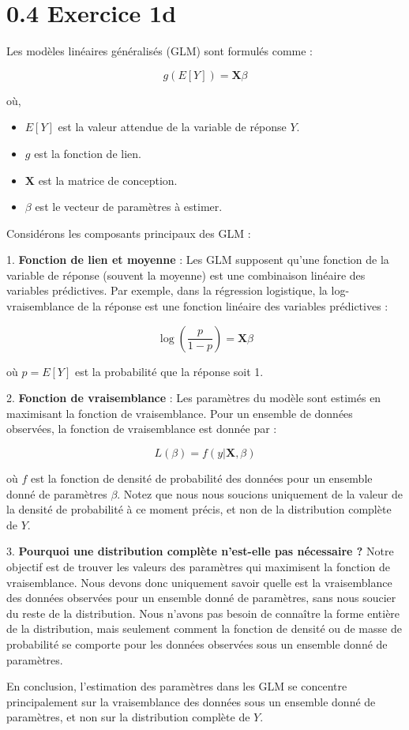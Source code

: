 \documentclass{article}
\begin{document}
\section*{0.4 Exercice 1d}

Les modèles linéaires généralisés (GLM) sont formulés comme :

\[ g(E[Y]) = \mathbf{X}\beta \]

où,
\begin{itemize}
    \item \( E[Y] \) est la valeur attendue de la variable de réponse \( Y \).
    \item \( g \) est la fonction de lien.
    \item \( \mathbf{X} \) est la matrice de conception.
    \item \( \beta \) est le vecteur de paramètres à estimer.
\end{itemize}

Considérons les composants principaux des GLM :

1. \textbf{Fonction de lien et moyenne} :
Les GLM supposent qu'une fonction de la variable de réponse (souvent la moyenne) est une combinaison linéaire des variables prédictives. Par exemple, dans la régression logistique, la log-vraisemblance de la réponse est une fonction linéaire des variables prédictives :

\[ \log\left(\frac{p}{1-p}\right) = \mathbf{X}\beta \]

où \( p = E[Y] \) est la probabilité que la réponse soit 1.

2. \textbf{Fonction de vraisemblance} :
Les paramètres du modèle sont estimés en maximisant la fonction de vraisemblance. Pour un ensemble de données observées, la fonction de vraisemblance est donnée par :

\[ L(\beta) = f(y | \mathbf{X}, \beta) \]

où \( f \) est la fonction de densité de probabilité des données pour un ensemble donné de paramètres \( \beta \). Notez que nous nous soucions uniquement de la valeur de la densité de probabilité à ce moment précis, et non de la distribution complète de \( Y \).

3. \textbf{Pourquoi une distribution complète n'est-elle pas nécessaire ?}
Notre objectif est de trouver les valeurs des paramètres qui maximisent la fonction de vraisemblance. Nous devons donc uniquement savoir quelle est la vraisemblance des données observées pour un ensemble donné de paramètres, sans nous soucier du reste de la distribution. Nous n'avons pas besoin de connaître la forme entière de la distribution, mais seulement comment la fonction de densité ou de masse de probabilité se comporte pour les données observées sous un ensemble donné de paramètres.

En conclusion, l'estimation des paramètres dans les GLM se concentre principalement sur la vraisemblance des données sous un ensemble donné de paramètres, et non sur la distribution complète de \( Y \).
\end{document}
